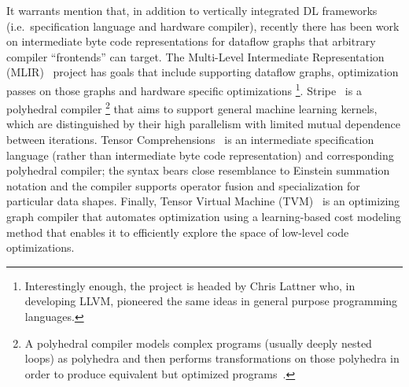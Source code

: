 It warrants mention that, in addition to vertically integrated DL frameworks (i.e.\ specification language and hardware compiler), recently there has been work on intermediate byte code representations for dataflow graphs that arbitrary compiler ``frontends'' can target.
The Multi-Level Intermediate Representation (MLIR)~\cite{lattner2020mlir} project has goals that include supporting dataflow graphs, optimization passes on those graphs and hardware specific optimizations%
\footnote{Interestingly enough, the project is headed by Chris Lattner who, in developing LLVM, pioneered the same ideas in general purpose programming languages.}.
Stripe~\cite{zerrell2019stripe} is a polyhedral compiler%
\footnote{A polyhedral compiler models complex programs (usually deeply nested loops) as polyhedra and then performs transformations on those polyhedra in order to produce equivalent but optimized programs~\cite{Griebl98codegeneration}.}
that aims to support general machine learning kernels, which are distinguished by their high parallelism with limited mutual dependence between iterations.
Tensor Comprehensions~\cite{vasilache2018tensor} is an intermediate specification language (rather than intermediate byte code representation) and corresponding polyhedral compiler;
the syntax bears close resemblance to Einstein summation notation and the compiler supports operator fusion and specialization for particular data shapes.
Finally, Tensor Virtual Machine (TVM)~\cite{10.5555/3291168.3291211} is an optimizing graph compiler that automates optimization using a learning-based cost modeling method that enables it to efficiently explore the space of low-level code optimizations.